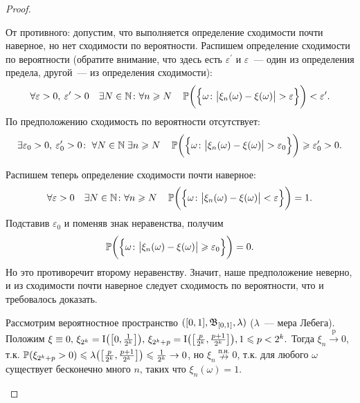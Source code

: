 \begin{proof}
\begin{compactlist}
    \item[$\text{п.н.} \implies \text{p}$]
        От противного: допустим, что выполняется определение сходимости почти наверное, но нет сходимости по вероятности.
        Распишем определение сходимости по вероятности (обратите внимание, что здесь есть $\varepsilon^\prime$ и $\varepsilon$~--- один из определения предела, другой~--- из определения сходимости):
        \begin{equation*}
            \forall \varepsilon > 0, \: \varepsilon^\prime > 0 \quad \exists N \in \mathbb{N}\colon \forall n \geqslant N \quad \operatorname{\mathbb{P}} \biggl( \Bigl\{ \omega \colon \bigl| \xi_n(\omega) - \xi(\omega) \bigr| > \varepsilon  \Bigr\}\biggr) < \varepsilon^\prime.
        \end{equation*}
        По предположению сходимость по вероятности отсутствует:
        \begin{equation*}
            \exists \varepsilon_0 > 0, \: \varepsilon_0^\prime > 0 \colon \; \forall N \in \mathbb{N} \; \exists n \geqslant N \quad \operatorname{\mathbb{P}} \biggl( \Bigl\{ \omega \colon \bigl| \xi_n(\omega) - \xi(\omega) \bigr| > \varepsilon_0 \Bigr\}\biggr) \geqslant \varepsilon_0^\prime > 0.
        \end{equation*}

        Распишем теперь определение сходимости почти наверное:
        \begin{equation*}
            \forall \varepsilon > 0 \quad \exists N \in \mathbb{N} \colon \forall n \geqslant N \quad \operatorname{\mathbb{P}} \biggl( \Bigl\{ \omega \colon \bigl| \xi_n(\omega) - \xi(\omega) \bigr| < \varepsilon \Bigr\} \biggr) = 1.
        \end{equation*}
        Подставив $\varepsilon_0$ и поменяв знак неравенства, получим
        \begin{equation*}
            \operatorname{\mathbb{P}} \biggl(\Bigl\{ \omega \colon \bigl| \xi_n(\omega) - \xi(\omega) \bigr| \geqslant \varepsilon_0 \Bigr\} \biggr) = 0.
        \end{equation*}
        Но это противоречит второму неравенству. 
        Значит, наше предположение неверно, и из сходимости почти наверное следует сходимость по вероятности, что и требовалось доказать.

    \item[$\text{п.н.} \notimpliedby \text{p}$]
    
        Рассмотрим вероятностное пространство $([0, 1], \mathfrak{B}_{[0, 1]}, \lambda)$ ($\lambda$~--- мера Лебега). Положим $\xi \equiv 0, \, \xi_{2^{k}}=\operatorname{\mathrm{I}}\bigl(\left[0, \frac{1}{2^{k}}\right]\bigr), \, \xi_{2^{k}+p}=\operatorname{\mathrm{I}}\bigl(\left[\frac{p}{2^{k}}, \frac{p+1}{2^{k}}\right]\bigr), 1 \leqslant p<2^{k}.$ 
        Тогда $\xi_n \xrightarrow[]{\text{p}} 0$, т.к. $\operatorname{\mathbb{P}}(\xi_{2^k + p} > 0) \leqslant \lambda\bigl(\left[\frac{p}{2^{k}}, \frac{p+1}{2^{k}}\right]\bigr) \leqslant \frac{1}{2^k} \to 0$, но $\xi_n \overset{\text{п.н.}}{\nrightarrow} 0$, т.к. для любого $\omega$ существует бесконечно много $n$, таких что $\xi_n(\omega) = 1.$


\end{compactlist}
\end{proof}
